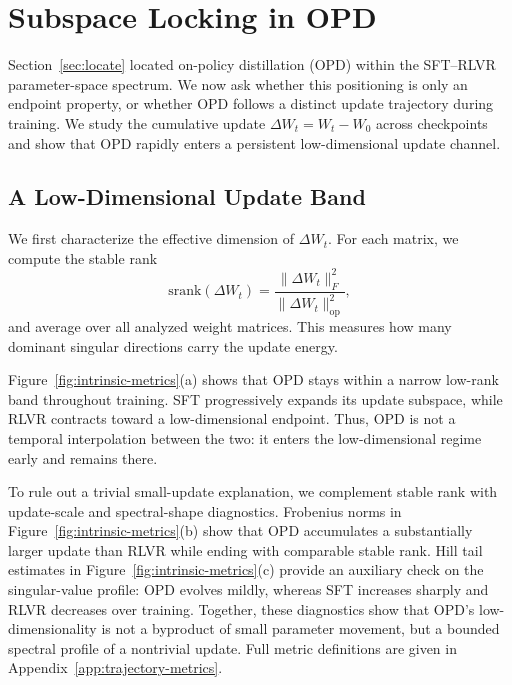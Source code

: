 \documentclass{llmxive}
\begin{document}



\section{Subspace Locking in OPD}
\label{sec:subspace-lock}

Section~\ref{sec:locate} located on-policy distillation (OPD) within the SFT--RLVR parameter-space spectrum. We now ask whether this positioning is only an endpoint property, or whether OPD follows a distinct update trajectory during training. We study the cumulative update
$\Delta W_t = W_t - W_0$ across checkpoints and show that OPD rapidly
enters a persistent low-dimensional update channel.

\subsection{A Low-Dimensional Update Band}
\label{sec:subspace-band}

We first characterize the effective dimension of $\Delta W_t$. For each
matrix, we compute the stable rank
\vspace{-1em}
\begin{equation}
    \mathrm{srank}(\Delta W_t)
    =
    \frac{\|\Delta W_t\|_F^2}{\|\Delta W_t\|_{\mathrm{op}}^2},
\end{equation}
and average over all analyzed weight matrices. This measures how many
dominant singular directions carry the update energy.

Figure~\ref{fig:intrinsic-metrics}(a) shows that OPD stays within a
narrow low-rank band throughout training. SFT progressively expands its
update subspace, while RLVR contracts toward a low-dimensional endpoint.
Thus, OPD is not a temporal interpolation between the two: it enters the
low-dimensional regime early and remains there.

To rule out a trivial small-update explanation, we complement stable rank
with update-scale and spectral-shape diagnostics. Frobenius norms in
Figure~\ref{fig:intrinsic-metrics}(b) show that OPD accumulates a
substantially larger update than RLVR while ending with comparable stable
rank. Hill tail estimates in Figure~\ref{fig:intrinsic-metrics}(c) provide
an auxiliary check on the singular-value profile: OPD evolves mildly,
whereas SFT increases sharply and RLVR decreases over training. Together,
these diagnostics show that OPD's low-dimensionality is not a byproduct of
small parameter movement, but a bounded spectral profile of a nontrivial
update. Full metric definitions are given in
Appendix~\ref{app:trajectory-metrics}.
\end{document}
